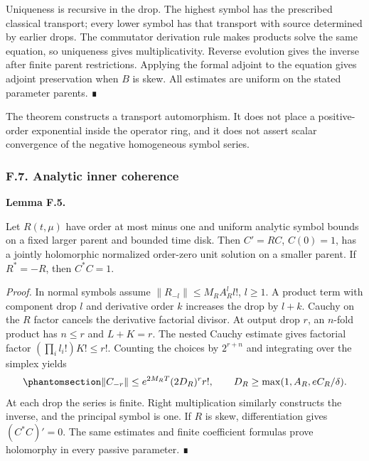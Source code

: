 \documentclass[
  english,
  11pt,
  reqno]{amsart}
\makeatletter
\newcommand{\pandocstatementheading}[1]{%
  \par\addpenalty{\@beginparpenalty}%
  \addvspace{.5\baselineskip plus .2\baselineskip minus .2\baselineskip}%
  {\normalfont\bfseries #1\par}%
  \nobreak\@afterindenttrue\@afterheading
}
\makeatother
\begin{document}
Uniqueness is recursive in the drop. The highest symbol has the
prescribed classical transport; every lower symbol has that transport
with source determined by earlier drops. The commutator derivation rule
makes products solve the same equation, so uniqueness gives
multiplicativity. Reverse evolution gives the inverse after finite
parent restrictions. Applying the formal adjoint to the equation gives
adjoint preservation when \(B\) is skew. All estimates are uniform on
the stated parameter parents. ∎

The theorem constructs a transport automorphism. It does not place a
positive-order exponential inside the operator ring, and it does not
assert scalar convergence of the negative homogeneous symbol series.

\protect{}\label{sec:gg-op-analytic-coherence}

\subsubsection{F.7. Analytic inner
coherence}\label{f.7.-analytic-inner-coherence}

\pandocstatementheading{\protect{}\label{lem:gg-op-negative-unit-evolution}Lemma F.5.}

Let \(R(t,\mu)\) have order at most minus one and uniform analytic
symbol bounds on a fixed larger parent and bounded time disk. Then
\(C'=RC\), \(C(0)=1\), has a jointly holomorphic normalized order-zero
unit solution on a smaller parent. If \(R^*=-R\), then \(C^*C=1\).

\emph{Proof.} In normal symbols assume \(\|R_{-l}\|\le M_RA_R^ll!\),
\(l\ge1\). A product term with component drop \(l\) and derivative order
\(k\) increases the drop by \(l+k\). Cauchy on the \(R\) factor cancels
the derivative factorial divisor. At output drop \(r\), an \(n\)-fold
product has \(n\le r\) and \(L+K=r\). The nested Cauchy estimate gives
factorial factor \((\prod_i l_i!)K!\le r!\). Counting the choices by
\(2^{r+n}\) and integrating over the simplex yields
\begin{equation}\protect\phantomsection\label{eq:gg-op-negative-unit-bound}{
 \|C_{-r}\|\le e^{2M_RT}(2D_R)^r r!,
 \qquad
 D_R\ge\max(1,A_R,eC_R/\delta).
}\end{equation} At each drop the series is finite. Right multiplication
similarly constructs the inverse, and the principal symbol is one. If
\(R\) is skew, differentiation gives \((C^*C)'=0\). The same estimates
and finite coefficient formulas prove holomorphy in every passive
parameter. ∎
\end{document}
